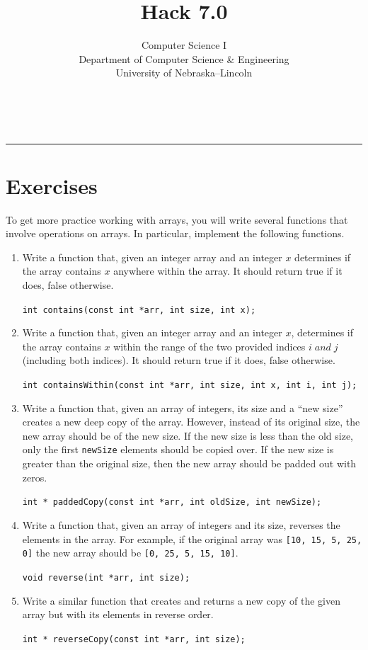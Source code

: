 \documentclass[12pt]{scrartcl}
\title{Hack 7.0}\let\Title\@title
\subtitle{Computer Science I\\
{\small
\vskip1cm
Department of Computer Science \& Engineering \\
University of Nebraska--Lincoln}
\vskip-1cm}
\date{~}
\begin{document}
\maketitle

\hrule



\newpage
\section*{Exercises}

To get more practice working with arrays, you will write several 
functions that involve operations on arrays.  In particular, implement
the following functions.

\begin{enumerate}

  \item Write a function that, given an integer array and an integer 
  $x$ determines if the array contains $x$ anywhere within the array.
  It should return true if it does, false otherwise.
  
  \texttt{int contains(const int *arr, int size, int x);}

  \item Write a function that, given an integer array and an integer 
  $x$, determines if the array contains $x$ within the range of the two provided indices $ i\;and\; j $ (including both indices).
  It should return true if it does, false otherwise.

  
  \texttt{int containsWithin(const int *arr, int size, int x, int i, int j);}
  
  \item Write a function that, given an array of integers, its size and a
  ``new size'' creates a new deep copy of the array.  However, instead of
  its original size, the new array should be of the new size.  If the new
  size is less than the old size, only the first \texttt{newSize} 
  elements should be copied over.  If the new size is greater than the original
  size, then the new array should be padded out with zeros.
  
  \texttt{int * paddedCopy(const int *arr, int oldSize, int newSize);}

  \item Write a function that, given an array of integers and its size, 
  reverses the elements in the array.  For example, if the original array
  was \texttt{[10, 15, 5, 25, 0]} the new array should be 
  \texttt{[0, 25, 5, 15, 10]}.
  
  \texttt{void reverse(int *arr, int size);}

  \item Write a similar function that creates and returns a new copy of 
  the given array but with its elements in reverse order. 
  
  \texttt{int * reverseCopy(const int *arr, int size);}

\end{enumerate}
\end{document}
